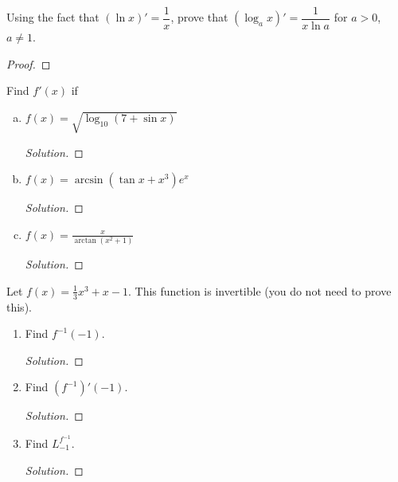 \question Using the fact that $(\ln x)' = \dfrac{1}{x}$,
prove that $(\log_a x)'=\dfrac{1}{x\ln a}$ for $a > 0$, $a \neq 1$.
\begin{proof}
\end{proof}


\question Find $f'(x)$ if
\begin{enumerate}[(a)]
  \item $f(x)=\sqrt{\log_{10}(7+\sin x)}$
        \begin{proof}[Solution]
        \end{proof}
  \item $f(x)=\arcsin(\tan x+x^3)e^x$
        \begin{proof}[Solution]
        \end{proof}
  \item $f(x)=\frac{x}{\arctan(x^2+1)}$
        \begin{proof}[Solution]
        \end{proof}
\end{enumerate}


\question Let $f(x)=\frac13x^3+x-1$. This function is invertible (you do not need to prove this).
\begin{enumerate}
  \item Find $f^{-1}(-1)$.
        \begin{proof}[Solution]
        \end{proof}
  \item Find $(f^{-1})'(-1)$.
        \begin{proof}[Solution]
        \end{proof}
  \item Find $L^{f^{-1}}_{-1}$.
        \begin{proof}[Solution]
        \end{proof}
\end{enumerate}

